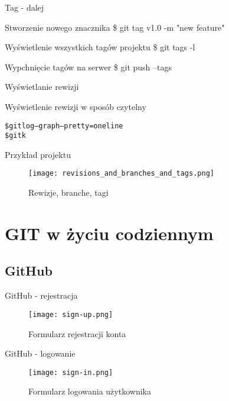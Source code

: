 \documentclass{beamer}
\begin{document}
\begin{frame}{Tag - dalej}
\begin{block}{Stworzenie nowego znacznika}
\$ git tag v1.0 -m "new feature"
\end{block}
\vskip 0.5cm
\begin{block}{Wyświetlenie wszystkich tagów projektu}
\$ git tags -l
\end{block}
\begin{block}{Wypchnięcie tagów na serwer}
\$ git push --tags
\end{block}
\end{frame}

\begin{frame}{Wyświetlanie rewizji}
\begin{block}{Wyświetlenie rewizji w sposób czytelny}
\begin{alltt}
\$ git log --graph --pretty=oneline \\
\$ gitk
\end{alltt}
\end{block}
\end{frame}

\begin{frame}{Przykład projektu}
	\begin{figure}
	\texttt{[image: revisions\_and\_branches\_and\_tags.png]}
	\caption{\label{Branches}Rewizje, branche, tagi}
	\end{figure}
\end{frame}


\section{GIT w życiu codziennym}

\subsection{GitHub}

\begin{frame}{GitHub - rejestracja}
	\begin{figure}
	\texttt{[image: sign-up.png]}
	\caption{\label{fig:sign-up}Formularz rejestracji konta}
	\end{figure}
\end{frame}

\begin{frame}{GitHub - logowanie}
	\begin{figure}
	\texttt{[image: sign-in.png]}
	\caption{\label{fig:sign-in}Formularz logowania użytkownika}
	\end{figure}
\end{frame}
\end{document}
